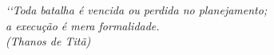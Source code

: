 
\begin{epigrafe}
  \vspace*{\fill}
  \begin{flushright}
    \textit{‘‘Toda batalha é vencida ou perdida no planejamento; \\
      a execução é mera formalidade. \\
      (Thanos de Titã)}
  \end{flushright}
\end{epigrafe}

\cleardoublepage

